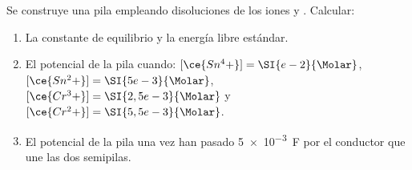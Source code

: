 Se construye una pila empleando disoluciones de los iones  y . Calcular:
\begin{enumerate}[label={\alph*)},font={\color{red!50!black}\bfseries}]
    \item La constante de equilibrio y la energía libre estándar.
    \item El potencial de la pila cuando:
        $[\ce{Sn^4+}] = \SI{e-2}{\Molar}$, $[\ce{Sn^2+}] = \SI{5e-3}{\Molar}$, $[\ce{Cr^3+}] = \SI{2,5e-3}{\Molar}$ y $[\ce{Cr^2+}] = \SI{5,5e-3}{\Molar}$.
    \item El potencial de la pila una vez han pasado \SI{5e-3}{\farad} por el conductor que une las dos semipilas.
\end{enumerate}
